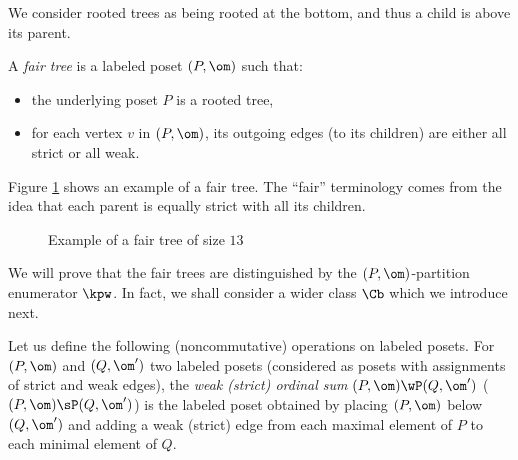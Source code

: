 We consider rooted trees as being rooted at the bottom, and thus a child is above its parent. 

\begin{definition}
A {\em fair tree} is a labeled poset $(P,\om)$ such that:
\begin{itemize}
\item the underlying poset $P$ is a rooted tree,
\item for each vertex $v$ in $(P,\om)$, its outgoing edges (to its children) are either all strict or all weak.
\end{itemize} 
\end{definition}
Figure \ref{fig:fair-tree-ex} shows an example of a fair tree.  The ``fair'' terminology comes from the idea that each parent is equally strict with all its children.  

\begin{figure}
\begin{center}
\end{center}
\caption{Example of a fair tree of size $13$}
\label{fig:fair-tree-ex}
\end{figure}

We will prove that the fair trees are distinguished by the $(P,\om)$-partition enumerator $\kpw$.  In fact, we shall consider a wider class $\Cb$ which we introduce next.  

Let us define the following (noncommutative) operations on labeled posets.
For $(P,\om)$ and $(Q,\om')$ two labeled posets (considered as posets with assignments of strict and weak edges),
the \emph{weak (\resp strict) ordinal sum} $(P,\om)\wP (Q,\om')$ (\resp $(P,\om)\sP (Q,\om')$) is the labeled poset obtained 
by placing $(P,\om)$ below $(Q,\om')$ 
and adding a weak (\resp strict) edge from each maximal element of $P$ to each minimal element of $Q$.  

